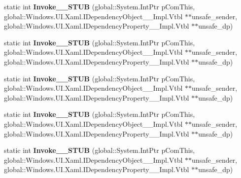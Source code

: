 \begin{DoxyCompactItemize}
\item 
\mbox{\label{struct_windows_1_1_u_i_1_1_xaml_1_1_dependency_property_changed_callback_____impl_1_1_vtbl_a73791845491917e6a36530b1ee582f67}} 
static int {\bfseries Invoke\+\_\+\+\_\+\+S\+T\+UB} (global\+::\+System.\+Int\+Ptr p\+Com\+This, global\+::\+Windows.\+U\+I.\+Xaml.\+I\+Dependency\+Object\+\_\+\+\_\+\+Impl.\+Vtbl $\ast$$\ast$unsafe\+\_\+sender, global\+::\+Windows.\+U\+I.\+Xaml.\+I\+Dependency\+Property\+\_\+\+\_\+\+Impl.\+Vtbl $\ast$$\ast$unsafe\+\_\+dp)
\item 
\mbox{\label{struct_windows_1_1_u_i_1_1_xaml_1_1_dependency_property_changed_callback_____impl_1_1_vtbl_a73791845491917e6a36530b1ee582f67}} 
static int {\bfseries Invoke\+\_\+\+\_\+\+S\+T\+UB} (global\+::\+System.\+Int\+Ptr p\+Com\+This, global\+::\+Windows.\+U\+I.\+Xaml.\+I\+Dependency\+Object\+\_\+\+\_\+\+Impl.\+Vtbl $\ast$$\ast$unsafe\+\_\+sender, global\+::\+Windows.\+U\+I.\+Xaml.\+I\+Dependency\+Property\+\_\+\+\_\+\+Impl.\+Vtbl $\ast$$\ast$unsafe\+\_\+dp)
\item 
\mbox{\label{struct_windows_1_1_u_i_1_1_xaml_1_1_dependency_property_changed_callback_____impl_1_1_vtbl_a73791845491917e6a36530b1ee582f67}} 
static int {\bfseries Invoke\+\_\+\+\_\+\+S\+T\+UB} (global\+::\+System.\+Int\+Ptr p\+Com\+This, global\+::\+Windows.\+U\+I.\+Xaml.\+I\+Dependency\+Object\+\_\+\+\_\+\+Impl.\+Vtbl $\ast$$\ast$unsafe\+\_\+sender, global\+::\+Windows.\+U\+I.\+Xaml.\+I\+Dependency\+Property\+\_\+\+\_\+\+Impl.\+Vtbl $\ast$$\ast$unsafe\+\_\+dp)
\item 
\mbox{\label{struct_windows_1_1_u_i_1_1_xaml_1_1_dependency_property_changed_callback_____impl_1_1_vtbl_a73791845491917e6a36530b1ee582f67}} 
static int {\bfseries Invoke\+\_\+\+\_\+\+S\+T\+UB} (global\+::\+System.\+Int\+Ptr p\+Com\+This, global\+::\+Windows.\+U\+I.\+Xaml.\+I\+Dependency\+Object\+\_\+\+\_\+\+Impl.\+Vtbl $\ast$$\ast$unsafe\+\_\+sender, global\+::\+Windows.\+U\+I.\+Xaml.\+I\+Dependency\+Property\+\_\+\+\_\+\+Impl.\+Vtbl $\ast$$\ast$unsafe\+\_\+dp)
\item 
\mbox{\label{struct_windows_1_1_u_i_1_1_xaml_1_1_dependency_property_changed_callback_____impl_1_1_vtbl_a73791845491917e6a36530b1ee582f67}} 
static int {\bfseries Invoke\+\_\+\+\_\+\+S\+T\+UB} (global\+::\+System.\+Int\+Ptr p\+Com\+This, global\+::\+Windows.\+U\+I.\+Xaml.\+I\+Dependency\+Object\+\_\+\+\_\+\+Impl.\+Vtbl $\ast$$\ast$unsafe\+\_\+sender, global\+::\+Windows.\+U\+I.\+Xaml.\+I\+Dependency\+Property\+\_\+\+\_\+\+Impl.\+Vtbl $\ast$$\ast$unsafe\+\_\+dp)
\end{DoxyCompactItemize}
